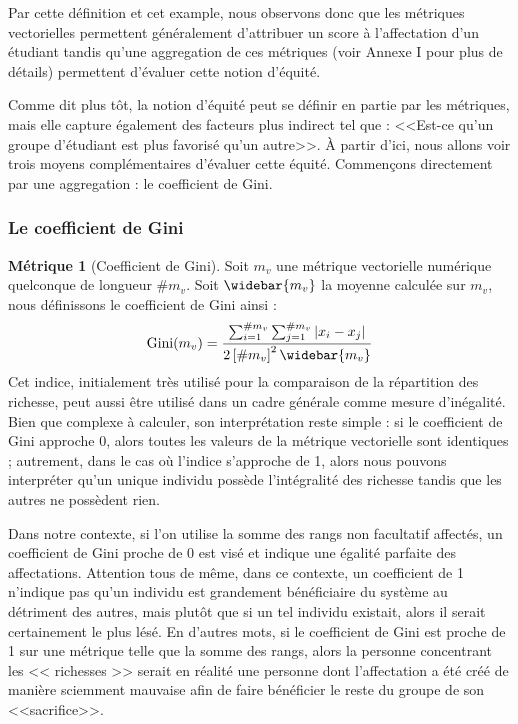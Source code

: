\documentclass{rapport}
\theoremstyle{definition}
\theoremstyle{remark}
\theoremstyle{plain}
\theoremstyle{definition}
\newtheorem*{metric}{Métrique}
\theoremstyle{remark}
\begin{document}
Par cette définition et cet example, nous observons donc que les métriques vectorielles permettent généralement d'attribuer un score à l'affectation d'un étudiant tandis qu'une aggregation de ces métriques (voir Annexe I pour plus de détails) permettent d'évaluer cette notion d'équité.

Comme dit plus tôt, la notion d'équité peut se définir en partie par les métriques, mais elle capture également des facteurs plus indirect tel que : <<Est-ce qu'un groupe d'étudiant est plus favorisé qu'un autre>>. À partir d'ici, nous allons voir trois moyens complémentaires d'évaluer cette équité. 
Commençons directement par une aggregation : le coefficient de Gini.

\subsubsection{Le coefficient de Gini}
\begin{metric}[Coefficient de Gini]
    Soit $m_v$ une métrique vectorielle numérique quelconque de longueur $\#m_v$. Soit $\widebar{m_v}$ la moyenne calculée sur $m_v$, nous définissons le coefficient de Gini ainsi :
    $$
        \text{Gini}(m_v) = \frac{\sum_{i=1}^{\#m_v}\sum_{j=1}^{\#m_v}\left|x_i-x_j\right|}{2\left[\#m_v\right]^2\widebar{m_v}}
    $$
    Cet indice, initialement très utilisé pour la comparaison de la répartition des richesse, peut aussi être utilisé dans un cadre générale comme mesure d'inégalité. 
    Bien que complexe à calculer, son interprétation reste simple : si le coefficient de Gini approche 0, alors toutes les valeurs de la métrique vectorielle sont identiques ; autrement, dans le cas où l'indice s'approche de 1, alors nous pouvons interpréter qu'un unique individu possède l'intégralité des richesse tandis que les autres ne possèdent rien.

    Dans notre contexte, si l'on utilise la somme des rangs non facultatif affectés, un coefficient de Gini proche de 0 est visé et indique une égalité parfaite des affectations. 
    Attention tous de même, dans ce contexte, un coefficient de 1 n'indique pas qu'un individu est grandement bénéficiaire du système au détriment des autres, mais plutôt que si un tel individu existait, alors il serait certainement le plus lésé. 
    En d'autres mots, si le coefficient de Gini est proche de 1 sur une métrique telle que la somme des rangs, alors la personne concentrant les << richesses >> serait en réalité une personne dont l'affectation a été créé de manière sciemment mauvaise afin de faire bénéficier le reste du groupe de son <<sacrifice>>.
\end{metric}
\end{document}

